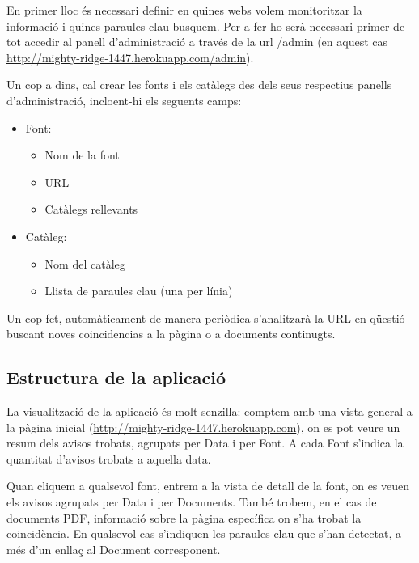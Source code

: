 \documentclass{article}
\begin{document}
En primer lloc és necessari definir en quines webs volem monitoritzar la informació i quines paraules clau busquem. Per a fer-ho serà necessari primer de tot accedir al panell d'administració a través de la url /admin (en aquest cas \url{http://mighty-ridge-1447.herokuapp.com/admin}).

Un cop a dins, cal crear les fonts i els catàlegs des dels seus respectius panells d'administració, incloent-hi els seguents camps:

\begin{itemize}
    \item Font:
    \begin{itemize}
        \item Nom de la font
        \item URL
        \item Catàlegs rellevants
    \end{itemize}
    \item Catàleg:
    \begin{itemize}
        \item Nom del catàleg
        \item Llista de paraules clau (una per línia)
    \end{itemize}
\end{itemize}

Un cop fet, automàticament de manera periòdica s'analitzarà la URL en qüestió buscant noves coincidencias a la pàgina o a documents continugts.

\subsection{Estructura de la aplicació}

La visualització de la aplicació és molt senzilla: comptem amb una vista general a la pàgina inicial (\url{http://mighty-ridge-1447.herokuapp.com}), on es pot veure un resum dels avisos trobats, agrupats per Data i per Font. A cada Font s'indica la quantitat d'avisos trobats a aquella data.

Quan cliquem a qualsevol font, entrem a la vista de detall de la font, on es veuen els avisos agrupats per Data i per Documents. També trobem, en el cas de documents PDF, informació sobre la pàgina específica on s'ha trobat la coincidència. En qualsevol cas s'indiquen les paraules clau que s'han detectat, a més d'un enllaç al Document corresponent.

\newpage
\end{document}
